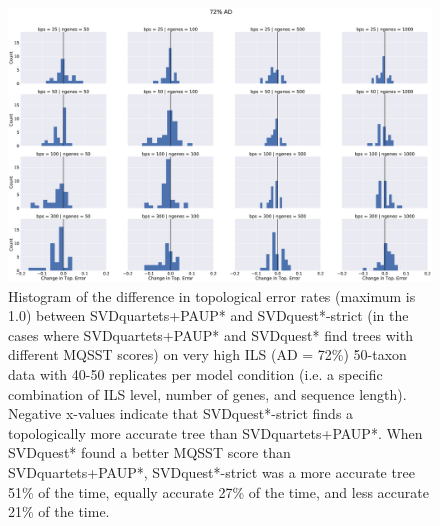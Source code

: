 \begin{figure}
\includegraphics[width=\textwidth]{svdquest-figs/differentscore-rfdists-hist-cgenes-72.eps}
\caption[Histogram of differences in topological error between SVDquartets+PAUP* and SVDquest*-strict for the very high ILS 50-taxon datasets]{Histogram of the difference in topological error rates (maximum is 1.0)  between
  SVDquartets+PAUP* and SVDquest*-strict (in the cases where SVDquartets+PAUP* and SVDquest* find trees
  with different MQSST scores)   on very high ILS (AD = 72\%) 50-taxon data
  with 40-50 replicates per model condition (i.e. a specific combination of ILS level, number of genes, and sequence length). 
  Negative x-values 
  indicate that SVDquest*-strict finds a topologically more accurate tree than
  SVDquartets+PAUP*.
When SVDquest* found a better MQSST score  than SVDquartets+PAUP*, SVDquest*-strict was a more
accurate tree 51\% of the time, equally accurate 27\% of the time, and
less accurate 21\% of the time.
}
\label{fig:s6}
\end{figure}

\clearpage





\clearpage

